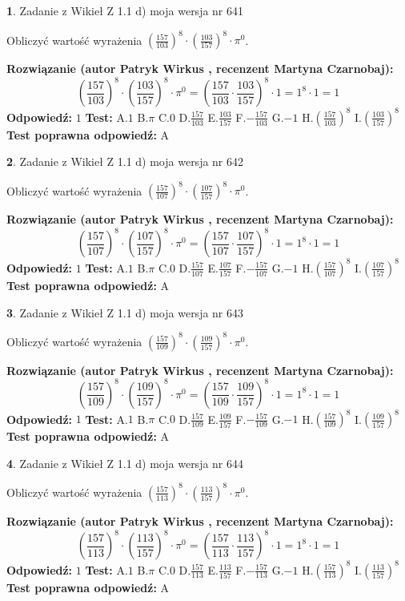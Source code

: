 \documentclass[12pt, a4paper]{article}
\theoremstyle{definition} %
\newtheorem{zad}{}
\newcommand{\zadStart}[1]{\begin{zad}#1\newline}
\newcommand{\zadStop}{\end{zad}}
\newcommand{\rozwStart}[2]{\noindent \textbf{Rozwiązanie (autor #1 , recenzent #2): }\newline}
\newcommand{\rozwStop}{\newline}
\newcommand{\odpStart}{\noindent \textbf{Odpowiedź:}\newline}
\newcommand{\odpStop}{\newline}
\newcommand{\testStart}{\noindent \textbf{Test:}\newline}
\newcommand{\testStop}{\newline}
\newcommand{\kluczStart}{\noindent \textbf{Test poprawna odpowiedź:}\newline}
\newcommand{\kluczStop}{\newline}
\begin{document}
\zadStart{Zadanie z Wikieł Z 1.1 d) moja wersja nr 641}

Obliczyć wartość wyrażenia $(\frac{157}{103})^{8} \cdot (\frac{103}{157})^{8} \cdot \pi^{0}$.
\zadStop
\rozwStart{Patryk Wirkus}{Martyna Czarnobaj}
$$(\frac{157}{103})^{8} \cdot (\frac{103}{157})^{8} \cdot \pi^{0} = (\frac{157}{103} \cdot \frac{103}{157})^{8} \cdot 1 = 1^{8} \cdot 1 = 1$$
\rozwStop
\odpStart
$1$
\odpStop
\testStart
A.$1$ B.$\pi$ C.$0$ D.$\frac{157}{103}$ E.$\frac{103}{157}$
F.$-\frac{157}{103}$ G.$-1$
H.$(\frac{157}{103})^{8}$
I.$(\frac{103}{157})^{8}$
\testStop
\kluczStart
A
\kluczStop



\zadStart{Zadanie z Wikieł Z 1.1 d) moja wersja nr 642}

Obliczyć wartość wyrażenia $(\frac{157}{107})^{8} \cdot (\frac{107}{157})^{8} \cdot \pi^{0}$.
\zadStop
\rozwStart{Patryk Wirkus}{Martyna Czarnobaj}
$$(\frac{157}{107})^{8} \cdot (\frac{107}{157})^{8} \cdot \pi^{0} = (\frac{157}{107} \cdot \frac{107}{157})^{8} \cdot 1 = 1^{8} \cdot 1 = 1$$
\rozwStop
\odpStart
$1$
\odpStop
\testStart
A.$1$ B.$\pi$ C.$0$ D.$\frac{157}{107}$ E.$\frac{107}{157}$
F.$-\frac{157}{107}$ G.$-1$
H.$(\frac{157}{107})^{8}$
I.$(\frac{107}{157})^{8}$
\testStop
\kluczStart
A
\kluczStop



\zadStart{Zadanie z Wikieł Z 1.1 d) moja wersja nr 643}

Obliczyć wartość wyrażenia $(\frac{157}{109})^{8} \cdot (\frac{109}{157})^{8} \cdot \pi^{0}$.
\zadStop
\rozwStart{Patryk Wirkus}{Martyna Czarnobaj}
$$(\frac{157}{109})^{8} \cdot (\frac{109}{157})^{8} \cdot \pi^{0} = (\frac{157}{109} \cdot \frac{109}{157})^{8} \cdot 1 = 1^{8} \cdot 1 = 1$$
\rozwStop
\odpStart
$1$
\odpStop
\testStart
A.$1$ B.$\pi$ C.$0$ D.$\frac{157}{109}$ E.$\frac{109}{157}$
F.$-\frac{157}{109}$ G.$-1$
H.$(\frac{157}{109})^{8}$
I.$(\frac{109}{157})^{8}$
\testStop
\kluczStart
A
\kluczStop



\zadStart{Zadanie z Wikieł Z 1.1 d) moja wersja nr 644}

Obliczyć wartość wyrażenia $(\frac{157}{113})^{8} \cdot (\frac{113}{157})^{8} \cdot \pi^{0}$.
\zadStop
\rozwStart{Patryk Wirkus}{Martyna Czarnobaj}
$$(\frac{157}{113})^{8} \cdot (\frac{113}{157})^{8} \cdot \pi^{0} = (\frac{157}{113} \cdot \frac{113}{157})^{8} \cdot 1 = 1^{8} \cdot 1 = 1$$
\rozwStop
\odpStart
$1$
\odpStop
\testStart
A.$1$ B.$\pi$ C.$0$ D.$\frac{157}{113}$ E.$\frac{113}{157}$
F.$-\frac{157}{113}$ G.$-1$
H.$(\frac{157}{113})^{8}$
I.$(\frac{113}{157})^{8}$
\testStop
\kluczStart
A
\kluczStop
\end{document}
